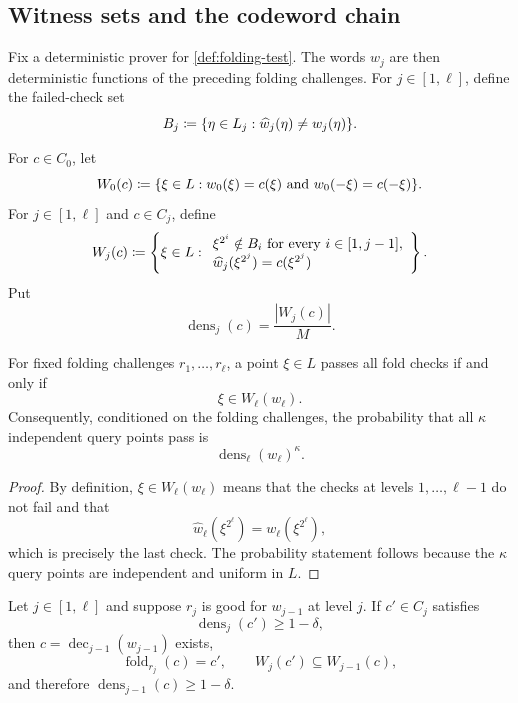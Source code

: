 \subsection{Witness sets and the codeword chain}
\label{sec:folding-witness-sets}

Fix a deterministic prover for \cref{def:folding-test}.  The words $w_j$ are then deterministic functions of the preceding folding challenges.  For $j\in[1,\ell]$, define the failed-check set
\[
  B_j
  \coloneqq
  \{\eta\in L_j:\widehat w_j(\eta)\ne w_j(\eta)\}.
\]

\begin{definition}
\label{def:folding-witness-sets}
For $c\in C_0$, let
\[
  W_0(c)
  \coloneqq
  \{\xi\in L:w_0(\xi)=c(\xi)\text{ and }w_0(-\xi)=c(-\xi)\}.
\]
For $j\in[1,\ell]$ and $c\in C_j$, define
\[
  W_j(c)
  \coloneqq
  \left\{
    \xi\in L:
    \begin{array}{l}
      \xi^{2^i}\notin B_i\text{ for every }i\in[1,j-1],\\
      \widehat w_j(\xi^{2^j})=c(\xi^{2^j})
    \end{array}
  \right\}.
\]
Put
\[
  \operatorname{dens}_j(c)=\frac{|W_j(c)|}{M}.
\]
\end{definition}

\begin{lemma}
\label{lem:acceptance-witness-set}
For fixed folding challenges $r_1,\ldots,r_\ell$, a point $\xi\in L$ passes all fold checks if and only if
\[
  \xi\in W_\ell(w_\ell).
\]
Consequently, conditioned on the folding challenges, the probability that all $\kappa$ independent query points pass is
\[
  \operatorname{dens}_\ell(w_\ell)^\kappa.
\]
\end{lemma}

\begin{proof}
By definition, $\xi\in W_\ell(w_\ell)$ means that the checks at levels $1,\ldots,\ell-1$ do not fail and that
\[
  \widehat w_\ell(\xi^{2^\ell})=w_\ell(\xi^{2^\ell}),
\]
which is precisely the last check.  The probability statement follows because the $\kappa$ query points are independent and uniform in $L$.
\end{proof}

\begin{lemma}
\label{lem:one-round-codeword-chain}
Let $j\in[1,\ell]$ and suppose $r_j$ is good for $w_{j-1}$ at level $j$.  If $c'\in C_j$ satisfies
\[
  \operatorname{dens}_j(c')\ge1-\delta,
\]
then $c=\operatorname{dec}_{j-1}(w_{j-1})$ exists,
\[
  \operatorname{fold}_{r_j}(c)=c',
  \qquad
  W_j(c')\subseteq W_{j-1}(c),
\]
and therefore $\operatorname{dens}_{j-1}(c)\ge1-\delta$.
\end{lemma}

